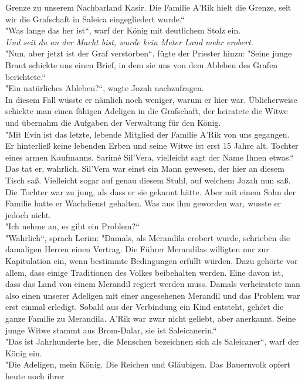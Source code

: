 Grenze zu unserem Nachbarland Kasir. Die Familie A'Rik hielt die Grenze, seit wir die Grafschaft in 
Saleica eingegliedert wurde.``\\
"Was lange das her ist``, warf der König mit deutlichem Stolz ein.\\
\textit{Und seit du an der Macht bist, wurde kein Meter Land mehr erobert.}\\
"Nun, aber jetzt ist der Graf verstorben``, fügte der Priester hinzu: "Seine junge Braut schickte 
uns einen Brief, in dem sie uns von dem Ableben des Grafen berichtete.``\\
"Ein natürliches Ableben?``, wagte Jozah nachzufragen.\\
In diesem Fall wüsste er nämlich noch weniger, warum er hier war. Üblicherweise schickte man einen 
fähigen Adeligen in die Grafschaft, der heiratete die Witwe und übernahm die Aufgaben der 
Verwaltung für den König.\\
"Mit Evin ist das letzte, lebende Mitglied der Familie A'Rik von uns gegangen. Er hinterließ keine 
lebenden Erben und seine Witwe ist erst 15 Jahre alt. Tochter eines armen Kaufmanns. Sarimé 
Sil'Vera, vielleicht sagt der Name Ihnen etwas.``\\
Das tat er, wahrlich. Sil'Vera war einst ein Mann gewesen, der hier an diesem Tisch saß. Vielleicht 
sogar auf genau diesem Stuhl, auf welchem Jozah nun saß. Die Tochter war zu jung, als dass er sie 
gekannt hätte. Aber mit einem Sohn der Familie hatte er Wachdienst gehalten. Was aus ihm geworden 
war, wusste er jedoch nicht.\\ 
"Ich nehme an, es gibt ein Problem?``\\
"Wahrlich``, sprach Lerim: "Damals, als Merandila erobert wurde, schrieben die damaligen Herren 
einen Vertrag. Die Führer Merandilas willigten nur zur Kapitulation ein, wenn bestimmte Bedingungen 
erfüllt würden. Dazu gehörte vor allem, dass einige Traditionen des Volkes beibehalten werden. Eine 
davon ist, dass das Land von einem Merandil regiert werden muss. Damals verheiratete man also einen 
unserer Adeligen mit einer angesehenen Merandil und das Problem war erst einmal erledigt. Sobald 
aus der Verbindung ein Kind entsteht, gehört die ganze Familie zu Merandila. A'Rik war zwar nicht 
geliebt, aber anerkannt. Seine junge Witwe stammt aus Brom-Dalar, sie ist Saleicanerin.``\\
"Das ist Jahrhunderte her, die Menschen bezeichnen sich als Saleicaner``, warf der König ein.\\
"Die Adeligen, mein König. Die Reichen und Gläubigen. Das Bauernvolk opfert heute noch ihrer 
